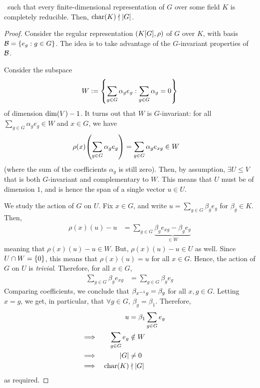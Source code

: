 \begin{theorem}
    \ such that every finite-dimensional representation of $G$ over some field $K$ is completely reducible. Then, $\operatorname{char}\!\left( K \right) \nmid \left\lvert G \right\rvert$.
\end{theorem}
\begin{proof}
    Consider the regular representation $\left( K[G], \rho \right)$ of $G$ over $K$, with basis $\mathcal{B} = \left\{ e_g : g \in G \right\}$. The idea is to take advantage of the $G$-invariant properties of $\mathcal{B}$.

    Consider the subspace
    \begin{align*}
        W := \left\{ \sum_{g \in G} \alpha_g e_g : \sum_{g \in G} \alpha_g = 0 \right\}
    \end{align*}
    of dimension $\dim\!\left( V \right) - 1$. It turns out that $W$ is $G$-invariant: for all $\sum_{g \in G} \alpha_g e_g \in W$ and $x \in G$, we have
    \begin{align*}
        \rho(x)\!\left( \sum_{g \in G} \alpha_g e_g \right) &= \sum_{g \in G} \alpha_g e_{xg} \in W
    \end{align*}
    (where the sum of the coefficients $\alpha_g$ is still zero). Then, by assumption, $\exists U \leq V$ that is both $G$-invariant and complementary to $W$. This means that $U$ must be of dimension $1$, and is hence the span of a single vector $u \in U$.

    We study the action of $G$ on $U$. Fix $x \in G$, and write $u = \sum_{g \in G} \beta_g e_g$ for $\beta_g \in K$. Then,
    \begin{align*}
        \rho(x)(u) - u
        &= \sum_{g \in G} \underbrace{\beta_g e_{xg} - \beta_g e_g}_{\in W}
    \end{align*}
    meaning that $\rho(x)(u) - u \in W$. But, $\rho(x)(u) - u \in U$ as well. Since $U \cap W = \left\{ 0 \right\}$, this means that $\rho(x)(u) = u$ for all $x \in G$. Hence, the action of $G$ on $U$ is \textit{trivial}. Therefore, for all $x \in G$,
    \begin{align*}
        \sum_{g \in G} \beta_g e_{xg} &= \sum_{g \in G} \beta_g e_g
    \end{align*}
    Comparing coefficients, we conclude that $\beta_{x^{-1} g} = \beta_g$ for all $x,g \in G$. Letting $x = g$, we get, in particular, that $\forall g \in G$, $\beta_g = \beta_1$. Therefore,
    \begin{align*}
        && u &= \beta_1 \sum_{g \in G} e_g &&& \\
        &\implies& \sum_{g \in G} e_g &\notin W &&& \\
        &\implies& \left\lvert G \right\rvert &\neq 0 &&& \\
        &\implies& \operatorname{char}\!\left( K \right) &\nmid \left\lvert G \right\rvert &&&
    \end{align*}
    as required.
\end{proof}

